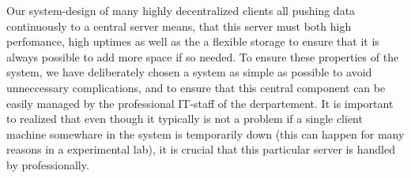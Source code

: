 Our system-design of many highly decentralized clients all pushing data
continuously to a central server means, that this server must both high
perfomance, high uptimes as well as the a flexible storage to ensure that it is
always possible to add more space if so needed. To ensure these properties of
the system, we have deliberately chosen a system as simple as possible to avoid
unneccessary complications, and to ensure that this central component can be
easily managed by the professional IT-staff of the derpartement. It is
important to realized that even though it typically is not a problem if a
single client machine somewhare in the system is temporarily down (this can
happen for many reasons in a experimental lab), it is crucial that this
particular server is handled by professionally.

